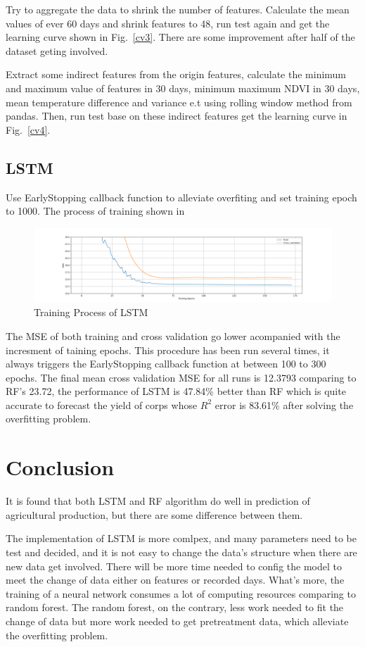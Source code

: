 \documentclass[conference]{IEEEtran}
\begin{document}
Try to aggregate the data to shrink the number of features. Calculate the mean values of ever 60 days and shrink features to 48, run test again and get the learning curve shown in Fig.~\ref{cv3}. There are some improvement after half of the dataset geting involved.

Extract some indirect features from the origin features, calculate the minimum and maximum value of features in 30 days, minimum maximum NDVI in 30 days, mean temperature difference and variance e.t using rolling window method from pandas. Then, run test base on these indirect features get the learning curve in Fig.~\ref{cv4}.

\subsection{LSTM}
Use EarlyStopping callback function to alleviate overfiting and set training epoch to 1000. The process of training shown in %

\begin{figure}[htbp]
  \centerline{\includegraphics[width=\linewidth]{figures/lp.png}}
  \caption{Training Process of LSTM}
  \label{fig:train}
\end{figure}

The MSE of both training and cross validation go lower acompanied with the incresment of taining epochs. This procedure has been run several times, it always triggers the EarlyStopping callback function at between 100 to 300 epochs. The final mean cross validation MSE for all runs is 12.3793 comparing to RF's 23.72, the performance of LSTM is 47.84\% better than RF which is quite accurate to forecast the yield of corps whose $R^2$ error is 83.61\% after solving the overfitting problem.

\section{Conclusion} \label{sec:con}
It is found that both LSTM and RF algorithm do well in prediction of agricultural production, but there are some difference between them.

The implementation of LSTM is more comlpex, and many parameters need to be test and decided, and it is not easy to change the data's structure when there are new data get involved. There will be more time needed to config the model to meet the change of data either on features or recorded days. What's more, the training of a neural network consumes a lot of computing resources comparing to random forest. The random forest, on the contrary, less work needed to fit the change of data but more work needed to get pretreatment data, which alleviate the overfitting problem.
\end{document}
